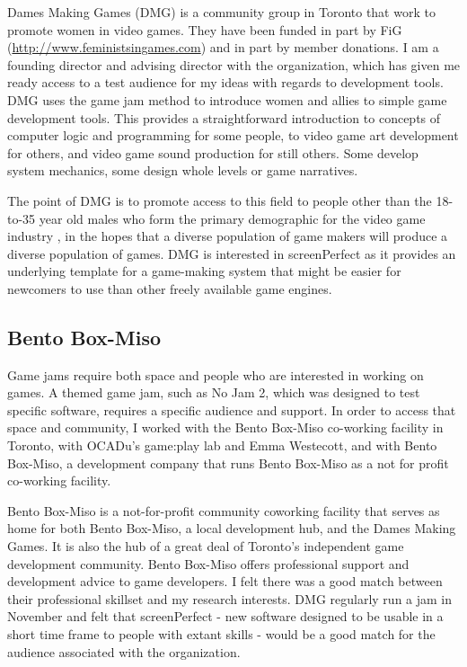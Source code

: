 Dames Making Games (DMG) is a community group in Toronto that work to promote women in video games. They have been funded in part by FiG (\url{http://www.feministsingames.com}) and in part by member donations. I am a founding director and advising director with the organization, which has given me ready access to a test audience for my ideas with regards to development tools. DMG uses the game jam method to introduce women and allies to simple game development tools. This provides a straightforward introduction to concepts of computer logic and programming for some people, to video game art development for others, and video game sound production for still others. Some develop system mechanics, some design whole levels or game narratives. 

The point of DMG is to promote access to this field to people other than the 18-to-35 year old males who form the primary demographic for the video game industry \parencite{esa, igda}, in the hopes that a diverse population of game makers will produce a diverse population of games. DMG is interested in screenPerfect as it provides an underlying template for a game-making system that might be easier for newcomers to use than other freely available game engines.

\subsection{Bento Box-Miso}
Game jams require both space and people who are interested in working on games. A themed game jam, such as No Jam 2, which was designed to test specific software, requires a specific audience and support. In order to access that space and community, I worked with the Bento Box-Miso co-working facility in Toronto, with OCADu's game:play lab and Emma Westecott, and with Bento Box-Miso, a development company that runs Bento Box-Miso as a not for profit co-working facility.

Bento Box-Miso is a not-for-profit community coworking facility that serves as home for both Bento Box-Miso, a local development hub, and the Dames Making Games. It is also the hub of a great deal of Toronto's independent game development community. Bento Box-Miso offers professional support and development advice to game developers. I felt there was a good match between their professional skillset and my research interests. DMG regularly run a jam in November and felt that screenPerfect - new software designed to be usable in a short time frame to people with extant skills - would be a good match for the audience associated with the organization. 


